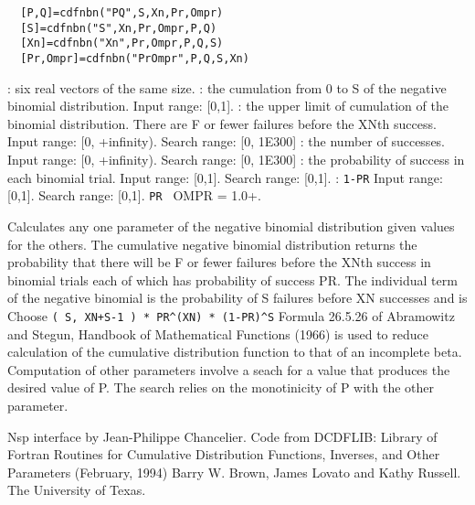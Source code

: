 \begin{mandesc}
\end{mandesc}
\label{cdfnbn}
\begin{calling_sequence}
\begin{verbatim}
  [P,Q]=cdfnbn("PQ",S,Xn,Pr,Ompr)  
  [S]=cdfnbn("S",Xn,Pr,Ompr,P,Q)  
  [Xn]=cdfnbn("Xn",Pr,Ompr,P,Q,S)  
  [Pr,Ompr]=cdfnbn("PrOmpr",P,Q,S,Xn)  
\end{verbatim}
\end{calling_sequence}
\begin{parameters}
  \begin{varlist}
    : six real vectors of the same size.
    : the cumulation from 0 to S of the  negative binomial distribution. Input range: [0,1].
    : the upper limit of cumulation of the binomial distribution. There are F or fewer failures before the XNth success. Input range: [0, +infinity). Search range: [0, 1E300]
      : the number of successes. Input range: [0, +infinity). Search range: [0, 1E300]
        :  the probability of success in each binomial trial. Input range: [0,1]. Search range: [0,1].
        :  \verb+1-PR+ Input range: [0,1]. Search range: [0,1]. \verb+PR + OMPR = 1.0+.
  \end{varlist}
\end{parameters}
\begin{mandescription}
  Calculates any one parameter of the negative binomial
  distribution given values for the others.
  The  cumulative  negative   binomial  distribution  returns  the
  probability that there  will be  F or fewer failures before  the
  XNth success in binomial trials each of which has probability of
  success PR.
  The individual term of the negative binomial is the probability of
  S failures before XN successes and is
  Choose \verb!( S, XN+S-1 ) * PR^(XN) * (1-PR)^S!
  Formula   26.5.26   of   Abramowitz  and  Stegun,  Handbook   of
  Mathematical Functions (1966) is used  to  reduce calculation of
  the cumulative distribution  function to that of  an  incomplete
  beta.
  Computation of other parameters involve a seach for a value that
  produces  the desired  value  of P.   The search relies  on  the
  monotinicity of P with the other parameter.
\end{mandescription}

\begin{authors}
  Nsp interface by Jean-Philippe Chancelier. Code from DCDFLIB: 
  Library of Fortran Routines for Cumulative Distribution
  Functions, Inverses, and Other Parameters (February, 1994)
  Barry W. Brown, James Lovato and Kathy Russell. The University of Texas.
\end{authors}

